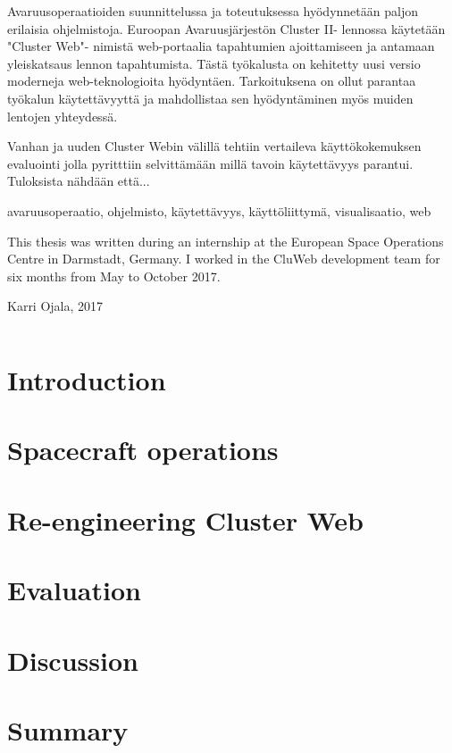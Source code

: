 \documentclass[a4paper, 12pt,titlepage]{dithesis}
\begin{document}
\begin{tiivistelma}
Avaruusoperaatioiden suunnittelussa ja toteutuksessa hyödynnetään paljon erilaisia ohjelmistoja. Euroopan Avaruusjärjestön Cluster II- lennossa käytetään "Cluster Web"- nimistä web-portaalia tapahtumien ajoittamiseen ja antamaan yleiskatsaus lennon tapahtumista. Tästä työkalusta on kehitetty uusi versio moderneja web-teknologioita hyödyntäen. Tarkoituksena on ollut parantaa työkalun käytettävyyttä ja mahdollistaa sen hyödyntäminen myös muiden lentojen yhteydessä.

Vanhan ja uuden Cluster Webin välillä tehtiin vertaileva käyttökokemuksen evaluointi jolla pyritttiin selvittämään millä tavoin käytettävyys parantui. Tuloksista nähdään että...

\avainsanat avaruusoperaatio, ohjelmisto, käytettävyys, käyttöliittymä, visualisaatio, web
\end{tiivistelma}


\sisluettelo

This thesis was written during an internship at the European Space Operations Centre in Darmstadt, Germany. I worked in the CluWeb development team for six months from May to October 2017.

Karri Ojala, 2017


\setlongtables
\begin{longtable}[l]{p{3cm}p{}}



\end{longtable}
\setcounter{table}{0}

\chapter{Introduction}
\sivunumerot

\chapter{Spacecraft operations}

\chapter{Re-engineering Cluster Web}\label{cluweb_chapter}

\chapter{Evaluation}

\chapter{Discussion}

\chapter{Summary}



\end{document}
